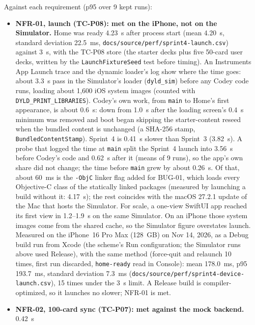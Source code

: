 \documentclass[12pt,letterpaper]{article}
\begin{document}
Against each requirement (p95 over 9 kept runs):
\begin{itemize}
  \item \textbf{NFR-01, launch (TC-P08): met on the iPhone, not on the Simulator.} Home was ready
        4.23~s after process start (mean 4.20~s, standard deviation 22.5~ms,
        \texttt{docs/source/perf/sprint4-launch.csv}) against
        3~s, with the TC-P08 store (the starter decks plus five 50-card user decks,
        written by the \texttt{LaunchFixtureSeed} test before timing). An Instruments App Launch trace and the
        dynamic loader's log show where the time goes: about 3.3~s pass in the
        Simulator's loader (\texttt{dyld\_sim}) before any Codey code runs, loading
        about 1{,}600 iOS system images (counted with \texttt{DYLD\_PRINT\_LIBRARIES}).
        Codey's own work, from \texttt{main} to Home's first appearance, is about
        0.6~s: down from 1.0~s after the loading screen's 0.4~s minimum was
        removed and boot began skipping the starter-content reseed when the bundled
        content is unchanged (a SHA-256 stamp, \texttt{BundledContentStamp}).
        Sprint~4 is 0.41~s slower than Sprint~3 (3.82~s). A probe that logged the
        time at \texttt{main} split the Sprint~4 launch into 3.56~s before Codey's
        code and 0.62~s after it (means of 9 runs), so the app's own share did not
        change; the time before \texttt{main} grew by about 0.26~s. Of that,
        about 60~ms is the \texttt{-ObjC} linker flag added for BUG-01, which loads
        every Objective-C class of the statically linked packages (measured by
        launching a build without it: 4.17~s); the rest coincides with the macOS
        27.2.1 update of the Mac that hosts the Simulator. For scale,
        a one-view SwiftUI app reached its first view in 1.2--1.9~s on the same
        Simulator. On an iPhone those system images come from the shared cache, so
        the Simulator figure overstates launch. Measured on the iPhone~16 Pro Max
        (128~GB) on Nov 14, 2026, as a Debug build run from Xcode (the scheme's Run
        configuration; the Simulator runs above used Release), with the same method (force-quit
        and relaunch 10 times, first run discarded, \texttt{home-ready} read in
        Console): mean 178.0~ms, p95 193.7~ms, standard deviation 7.3~ms
        (\texttt{docs/source/perf/sprint4-device-launch.csv}), 15 times under the
        3~s limit. A Release build is compiler-optimized, so it launches no slower; NFR-01
        is met.
  \item \textbf{NFR-02, 100-card sync (TC-P07): met against the mock backend.} 0.42~s

\end{itemize}
\end{document}
